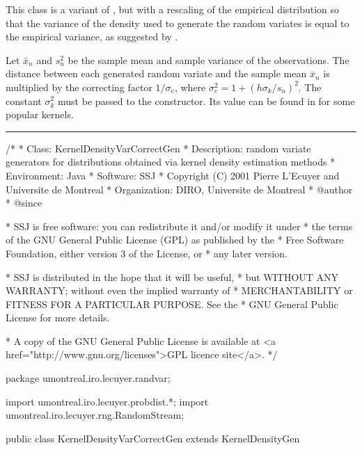 
This class is a variant of , but with
a rescaling of the empirical distribution so that the variance
of the density used to generate the random variates is equal
to the empirical variance,
 as suggested by .

Let $\bar x_n$ and $s_n^2$ be the sample mean and sample variance 
of the observations.
The distance between each generated random variate and the 
sample mean $\bar x_n$ is multiplied by the correcting factor
$1/\sigma_e$, where $\sigma_e^2 = 1 + (h\sigma_k/s_n)^2$.
The constant $\sigma_k^2$ must be passed to the constructor.
Its value can be found in 
 for some popular
kernels.


\bigskip\hrule

\begin{code}
\begin{hide}
/*
 * Class:        KernelDensityVarCorrectGen
 * Description:  random variate generators for distributions obtained via
                 kernel density estimation methods
 * Environment:  Java
 * Software:     SSJ 
 * Copyright (C) 2001  Pierre L'Ecuyer and Universite de Montreal
 * Organization: DIRO, Universite de Montreal
 * @author       
 * @since

 * SSJ is free software: you can redistribute it and/or modify it under
 * the terms of the GNU General Public License (GPL) as published by the
 * Free Software Foundation, either version 3 of the License, or
 * any later version.

 * SSJ is distributed in the hope that it will be useful,
 * but WITHOUT ANY WARRANTY; without even the implied warranty of
 * MERCHANTABILITY or FITNESS FOR A PARTICULAR PURPOSE.  See the
 * GNU General Public License for more details.

 * A copy of the GNU General Public License is available at
   <a href="http://www.gnu.org/licenses">GPL licence site</a>.
 */
\end{hide}
package umontreal.iro.lecuyer.randvar;\begin{hide}
import umontreal.iro.lecuyer.probdist.*;
import umontreal.iro.lecuyer.rng.RandomStream;\end{hide}

public class KernelDensityVarCorrectGen extends KernelDensityGen\begin{hide} {

   protected double sigmak2;   // Value of sigma_k^2.
   protected double mean;      // Sample mean of the observations.
   protected double invSigmae; // 1 / sigma_e.
\end{hide}
\end{code}
